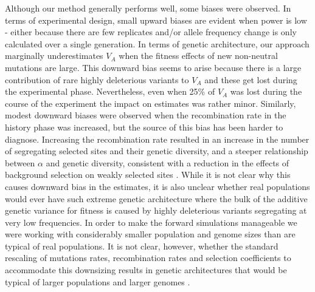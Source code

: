 \documentclass[12pt]{article}
\begin{document}
\begin{bibunit}
Although our method generally performs well, some biases were observed. In terms of experimental design, small upward biases are evident when power is low - either because there are few replicates and/or allele frequency change is only calculated over a single generation. In terms of genetic architecture, our approach marginally underestimates $V_A$ when the fitness effects of new non-neutral mutations are large. This downward bias seems to arise because there is a large contribution of rare highly deleterious variants to $V_A$ and these get lost during the experimental phase. Nevertheless, even when 25\% of $V_A$ was lost during the course of the experiment the impact on estimates was rather minor.  Similarly, modest downward biases were observed when the recombination rate in the history phase was increased, but the source of this bias has been harder to diagnose. Increasing the recombination rate resulted in an increase in the number of segregating selected sites and their genetic diversity, and a steeper relationship between $\alpha$ and genetic diversity, consistent with a reduction in the effects of background selection \citep{charlesworth1993effect} on weakly selected sites \citep{stephan1999effect}.  While it is not clear why this causes downward bias in the estimates, it is also unclear whether real populations would ever have such extreme genetic architecture where the bulk of the additive genetic variance for fitness is caused by highly deleterious variants segregating at very low frequencies. In order to make the forward simulations manageable we were working with considerably smaller population and genome sizes than are typical of real populations. It is not clear, however, whether the standard rescaling of mutations rates, recombination rates and selection coefficients to accommodate this downsizing results in genetic architectures that would be typical of larger populations and larger genomes \citep{dabi2025population}. 


\end{bibunit}
\end{document}
